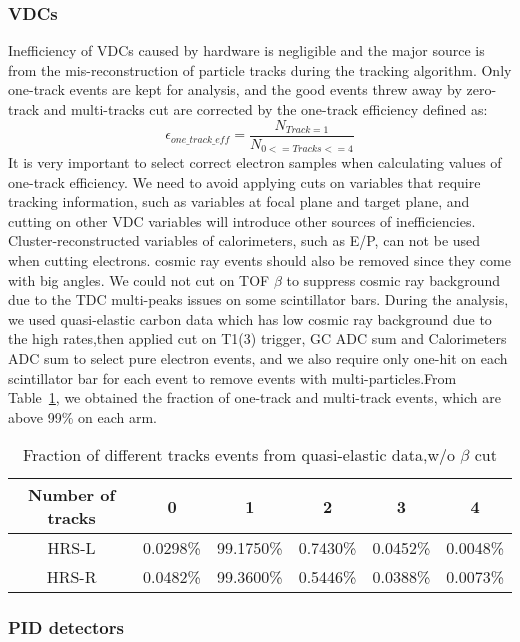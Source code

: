 \documentclass[a4paper,18.pt]{article}
\begin{document}
\subsubsection{VDCs}

Inefficiency of VDCs caused by hardware is negligible and the major source is from the mis-reconstruction of particle tracks during the tracking algorithm. Only one-track events are kept for analysis, and the good events threw away by zero-track and multi-tracks cut are corrected by the one-track efficiency defined as:
\begin{equation}
 \epsilon_{one\_track\_eff} = \frac{N_{Track=1}}{N_{0<=Tracks<=4}}
\end{equation}
 It is very important to select correct electron samples when calculating values of one-track efficiency. We need to avoid applying cuts on variables that require tracking information, such as variables at focal plane and target plane, and cutting on other VDC variables will introduce other sources of inefficiencies. Cluster-reconstructed variables of calorimeters, such as E/P, can not be used when cutting electrons. cosmic ray events should also be removed since they come with big angles. We could not cut on TOF $\beta$ to suppress cosmic ray background due to the TDC multi-peaks issues on some scintillator bars. During the analysis, we used quasi-elastic carbon data which has low cosmic ray background due to the high rates,then applied cut on T1(3) trigger, GC ADC sum and Calorimeters ADC sum to select pure electron events, and we also require only one-hit on each scintillator bar for each event to remove events with multi-particles.From Table~\ref{vdc_table}, we obtained the fraction of one-track and multi-track events, which are above 99\% on each arm.

\begin{table}[h!]
\centering
\begin{tabular}{|c||ccccc|}
	\hline
\textbf{Number of tracks}  & 0 & 1 & 2 & 3 & 4     \\
	\hline \hline
HRS-L   & 0.0298\% & 99.1750\% & 0.7430\% & 0.0452\% & 0.0048\%  \\
        \hline
HRS-R   & 0.0482\% & 99.3600\% & 0.5446\% & 0.0388\% & 0.0073\%  \\
	\hline \hline
\end{tabular}
\caption{Fraction of different tracks events from quasi-elastic data,w/o $\beta$ cut}
\label{vdc_table}	
\end{table}

\subsubsection{PID detectors}
\end{document}
